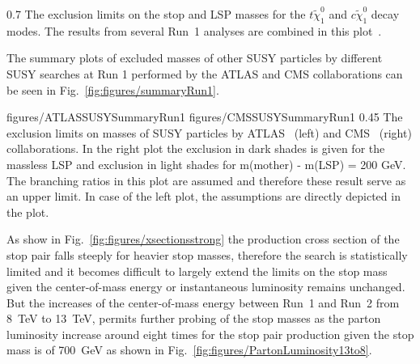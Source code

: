 
                 {0.7}       %
                { The exclusion limits on the stop and LSP masses for the $t \tilde{\chi}_{1}^0$ and $c \tilde{\chi}_{1}^0$ decay modes. The results from several Run~1 analyses are combined in this plot~\cite{website:SUSYresRunI}.   } %

The summary plots of excluded masses of other SUSY particles by different SUSY searches at Run 1 performed by the ATLAS and CMS collaborations can be seen in Fig.~\ref{fig:figures/summaryRun1}.


                 {figures/ATLASSUSYSummaryRun1}
                 {figures/CMSSUSYSummaryRun1} %
                 {0.45}       %
                 {The exclusion limits on masses of SUSY particles by ATLAS~\cite{website:SUSYresRunIATLAS} (left) and CMS~\cite{website:SUSYresRunI} (right) collaborations. In the right plot the exclusion in dark shades is given for the massless LSP and exclusion in light shades for m(mother) - m(LSP) = 200 GeV. The branching ratios in this plot are assumed and therefore these result serve as an upper limit. In case of the left plot, the assumptions are directly depicted in the plot.}

As show in Fig.~\ref{fig:figures/xsectionsstrong} the production cross section of the stop pair falls steeply for heavier stop masses, therefore the search is statistically limited and it becomes difficult to largely extend the limits on the stop mass given the center-of-mass energy or instantaneous luminosity remains unchanged. But the increases of the center-of-mass energy between Run~1 and Run~2 from 8~TeV to 13~TeV, permits further probing of the stop masses as the parton luminosity increase around eight times for the stop pair production given the stop mass is of 700~GeV as shown in Fig.~\ref{fig:figures/PartonLuminosity13to8}.  

